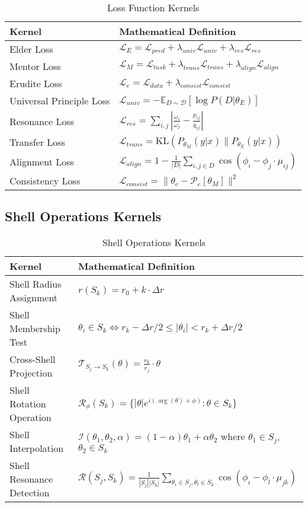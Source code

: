 \begin{table}[h]
\centering
\small
\caption{Loss Function Kernels}
\label{tab:loss_kernels}
\begin{tabular}{|p{5cm}|p{9cm}|}
\hline
\textbf{Kernel} & \textbf{Mathematical Definition} \\
\hline
Elder Loss & $\mathcal{L}_E = \mathcal{L}_{pred} + \lambda_{univ} \mathcal{L}_{univ} + \lambda_{res} \mathcal{L}_{res}$ \\
\hline
Mentor Loss & $\mathcal{L}_M = \mathcal{L}_{task} + \lambda_{trans} \mathcal{L}_{trans} + \lambda_{align} \mathcal{L}_{align}$ \\
\hline
Erudite Loss & $\mathcal{L}_e = \mathcal{L}_{data} + \lambda_{consist} \mathcal{L}_{consist}$ \\
\hline
Universal Principle Loss & $\mathcal{L}_{univ} = -\mathbb{E}_{D \sim \mathcal{D}} [\log P(D | \theta_E)]$ \\
\hline
Resonance Loss & $\mathcal{L}_{res} = \sum_{i,j} \left| \frac{\omega_i}{\omega_j} - \frac{p_{ij}}{q_{ij}} \right|$ \\
\hline
Transfer Loss & $\mathcal{L}_{trans} = \text{KL}(P_{\theta_M}(y|x) \| P_{\theta_E}(y|x))$ \\
\hline
Alignment Loss & $\mathcal{L}_{align} = 1 - \frac{1}{|D|} \sum_{i,j \in D} \cos(\phi_i - \phi_j \cdot \mu_{ij})$ \\
\hline
Consistency Loss & $\mathcal{L}_{consist} = \|\theta_e - \mathcal{P}_e[\theta_M]\|^2$ \\
\hline
\end{tabular}
\end{table}

\subsection{Shell Operations Kernels}

\begin{table}[h]
\centering
\small
\caption{Shell Operations Kernels}
\label{tab:shell_kernels}
\begin{tabular}{|p{5cm}|p{9cm}|}
\hline
\textbf{Kernel} & \textbf{Mathematical Definition} \\
\hline
Shell Radius Assignment & $r(S_k) = r_0 + k \cdot \Delta r$ \\
\hline
Shell Membership Test & $\theta_i \in S_k \iff r_k - \Delta r/2 \leq |\theta_i| < r_k + \Delta r/2$ \\
\hline
Cross-Shell Projection & $\mathcal{T}_{S_j \to S_k}(\theta) = \frac{r_k}{r_j} \cdot \theta$ \\
\hline
Shell Rotation Operation & $\mathcal{R}_{\phi}(S_k) = \{|\theta|e^{i(\arg(\theta) + \phi)} : \theta \in S_k\}$ \\
\hline
Shell Interpolation & $\mathcal{I}(\theta_1, \theta_2, \alpha) = (1-\alpha)\theta_1 + \alpha\theta_2$ where $\theta_1 \in S_j$, $\theta_2 \in S_k$ \\
\hline
Shell Resonance Detection & $\mathcal{R}(S_j, S_k) = \frac{1}{|S_j||S_k|} \sum_{\theta_i \in S_j, \theta_l \in S_k} \cos(\phi_i - \phi_l \cdot \mu_{jk})$ \\
\hline
\end{tabular}
\end{table}

